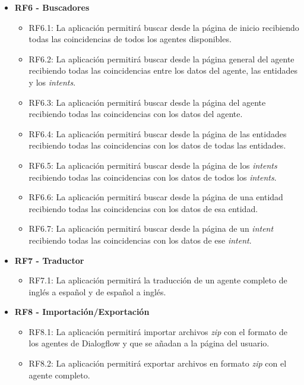 \begin{itemize}
    \item \textbf{RF6 - Buscadores}
    \begin{itemize}
        \item RF6.1: La aplicación permitirá buscar desde la página de inicio recibiendo todas las coincidencias de todos los agentes disponibles.
        \item RF6.2: La aplicación permitirá buscar desde la página general del agente recibiendo todas las coincidencias entre los datos del agente, las entidades y los \textit{intents}.
        \item RF6.3: La aplicación permitirá buscar desde la página del agente recibiendo todas las coincidencias con los datos del agente.
        \item RF6.4: La aplicación permitirá buscar desde la página de las entidades recibiendo todas las coincidencias con los datos de todas las entidades.
        \item RF6.5: La aplicación permitirá buscar desde la página de los \textit{intents} recibiendo todas las coincidencias con los datos de todos los \textit{intents}.
        \item RF6.6: La aplicación permitirá buscar desde la página de una entidad recibiendo todas las coincidencias con los datos de esa entidad.
        \item RF6.7: La aplicación permitirá buscar desde la página de un \textit{intent} recibiendo todas las coincidencias con los datos de ese \textit{intent}.
    \end{itemize}

    \item \textbf{RF7 - Traductor}
    \begin{itemize}
        \item RF7.1: La aplicación permitirá la traducción de un agente completo de inglés a español y de español a inglés.
    \end{itemize}

    \item \textbf{RF8 - Importación/Exportación}
    \begin{itemize}
        \item RF8.1: La aplicación permitirá importar archivos \textit{zip} con el formato de los agentes de Dialogflow y que se añadan a la página del usuario.
        \item RF8.2: La aplicación permitirá exportar archivos en formato \textit{zip} con el agente completo.
    \end{itemize}
\end{itemize}
    
